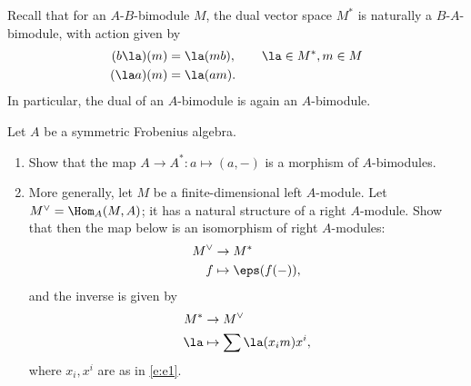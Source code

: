 \begin{exercise}\label{ec:dual-module-frob}
  Recall that for an $A$-$B$-bimodule $M$, the dual vector space $M^*$
  is naturally a $B$-$A$-bimodule, with action given by
  \begin{align*}
    (b\la) (m) & = \la (mb),\qquad \la\in M^*, m\in M\\
    (\la a) (m) &= \la (am).
  \end{align*}
  In particular, the dual of an $A$-bimodule is again an $A$-bimodule.

  Let $A$ be a symmetric Frobenius algebra.
  \begin{enumerate}
    \item
      Show that the map $A\to A^*\colon a\mapsto (a, -)$ is a morphism of
      $A$-bimodules.
    \item
      More generally, let $M$ be a finite-dimensional left $A$-module. Let
      $M^\vee =\Hom_A(M, A)$; it has a natural structure of a right
      $A$-module. Show that then the map below is an isomorphism of right
      $A$-modules: %
      \begin{align*}
        M^\vee &\to M^*\\
        f&\mapsto \eps(f(-)),
      \end{align*}
      and the inverse is given by
      \begin{align*}
        M^* &\to M^\vee\\
        \la&\mapsto \sum \la(x_im)x^i,
      \end{align*}
      where $x_i, x^i$ are as in \eqref{e:e1}.
  \end{enumerate}
\end{exercise}
\clearpage
